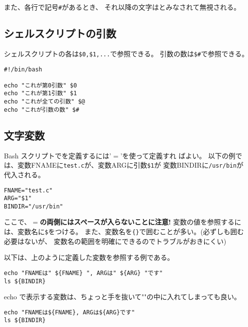 \documentclass{jreport}
\begin{document}
また、各行で記号\verb|#|があるとき、
それ以降の文字はとみなされて無視される。

\subsection{シェルスクリプトの引数}

\index{\$\#}
シェルスクリプトの各は\verb|$0,$1,...|で参照できる。
引数の数は\verb|$#|で参照できる。
\begin{screen}
\begin{verbatim}
#!/bin/bash

echo "これが第0引数" $0
echo "これが第1引数" $1
echo "これが全ての引数" $@
echo "これが引数の数" $#
\end{verbatim}
\end{screen}

\subsection{文字変数}

Bash スクリプトでを定義するには'$=$'を使って定義すれ
ばよい。
以下の例では、変数FNAMEに\verb|test.c|が、変数ARGに引数\verb|$1|が
変数BINDIRに\verb|/usr/bin|が代入される。
\begin{screen}
\begin{verbatim}
FNAME="test.c"
ARG="$1"
BINDIR="/usr/bin"
\end{verbatim}
\end{screen}
ここで、\textbf{$=$の両側にはスペースが入らないことに注意!}
変数の値を参照するには、変数名に\verb|$|をつける。
また、変数名を\verb|{}|で囲むことが多い。(必ずしも囲む必要はないが、
変数名の範囲を明確にできるのでトラブルがおきにくい)

以下は、上のように定義した変数を参照する例である。
\begin{screen}
\begin{verbatim}
echo "FNAMEは" ${FNAME} ", ARGは" ${ARG} "です"
ls ${BINDIR}
\end{verbatim}
\end{screen}
echo で表示する変数は、ちょっと手を抜いて""の中に入れてしまっても良い。
\begin{screen}
\begin{verbatim}
echo "FNAMEは${FNAME}, ARGは${ARG}です"
ls ${BINDIR}
\end{verbatim}
\end{screen}
\end{document}
